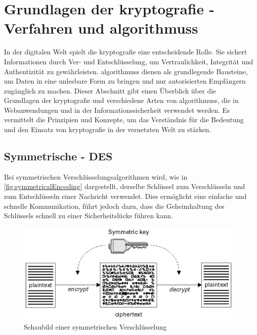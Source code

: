 \newpage


\section[Grundlagen der Kryptografie - Kryptografische Verfahren und Algorithmen]{Grundlagen der \gls{kryptografie} -  Verfahren und \glspl{algorithmus}}\label{sec:grundlagen-der-kryptografie}


In der digitalen Welt spielt die \Gls{kryptografie} eine entscheidende Rolle. Sie sichert Informationen durch Ver- und Entschlüsselung, um Vertraulichkeit, Integrität und Authentizität zu gewährleisten.
 \glspl{algorithmus} dienen als grundlegende Bausteine, um Daten in eine unlesbare Form zu bringen und nur autorisierten Empfängern zugänglich zu machen.
Dieser Abschnitt gibt einen Überblick über die Grundlagen der \Gls{kryptografie} und verschiedene Arten von \glspl{algorithmus}, die in Webanwendungen und in der Informationssicherheit verwendet werden.
Es vermittelt die Prinzipien und Konzepte, um das Verständnis für die Bedeutung und den Einsatz von \Gls{kryptografie} in der vernetzten Welt zu stärken.


\subsection[Symmetrische Verschlüsselungsalgorithmen]{Symmetrische  - \acf{DES}}\label{subsec:symmetrsiche-algorithmen}
Bei symmetrischen Verschlüsselungsalgorithmen wird, wie in \autoref{fig:symmetricalEncoding}\autocite{Chapter211:online} dargestellt, derselbe Schlüssel zum Verschlüsseln und zum Entschlüsseln einer Nachricht verwendet.
Dies ermöglicht eine einfache und schnelle Kommunikation, führt jedoch dazu, dass die Geheimhaltung des Schlüssels schnell zu einer Sicherheitslücke führen kann.

\begin{figure}[htbp]
    \includegraphics[width=1\linewidth]{abbildungen/symmetricEncoding}
    \centering
    \caption[
        Schaubild einer symmetrischen Verschlüsselung]{Schaubild einer symmetrischen Verschlüsselung\footnotemark}
    \label{fig:symmetricalEncoding}
\end{figure}


